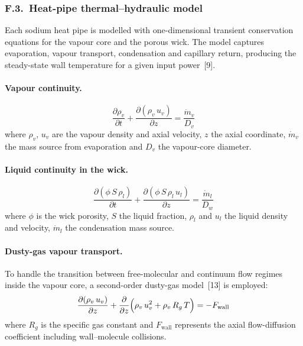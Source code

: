 \documentclass[11pt,a4paper]{article}
\begin{document}
\subsubsection*{F.3.~Heat-pipe thermal--hydraulic model}

Each sodium heat pipe is modelled with one-dimensional transient
conservation equations for the vapour core and the porous wick. The
model captures evaporation, vapour transport, condensation and capillary
return, producing the steady-state wall temperature for a given input
power~[9].

\paragraph{Vapour continuity.}
\begin{equation}
\frac{\partial \rho_v}{\partial t}
+ \frac{\partial(\rho_v\,u_v)}{\partial z}
= \frac{\dot{m}_v}{D_v}
\end{equation}
where $\rho_v$, $u_v$ are the vapour density and axial velocity, $z$
the axial coordinate, $\dot{m}_v$ the mass source from evaporation and
$D_v$ the vapour-core diameter.

\paragraph{Liquid continuity in the wick.}
\begin{equation}
\frac{\partial(\phi\,S\,\rho_l)}{\partial t}
+ \frac{\partial(\phi\,S\,\rho_l\,u_l)}{\partial z}
= \frac{\dot{m}_l}{D_w}
\end{equation}
where $\phi$ is the wick porosity, $S$ the liquid fraction, $\rho_l$
and $u_l$ the liquid density and velocity, $\dot{m}_l$ the condensation
mass source.

\paragraph{Dusty-gas vapour transport.}
To handle the transition between free-molecular and continuum flow
regimes inside the vapour core, a second-order dusty-gas model~[13] is
employed:
\begin{equation}
\frac{\partial(\rho_v\,u_v)}{\partial z}
+ \frac{\partial}{\partial z}
  \Bigl(\rho_v\,u_v^2 + \rho_v\,R_g\,T\Bigr)
= -F_\mathrm{wall}
\end{equation}
where $R_g$ is the specific gas constant and $F_\mathrm{wall}$
represents the axial flow-diffusion coefficient including wall--molecule
collisions.
\end{document}
